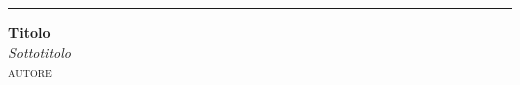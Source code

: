 \begin{titlepage}
	
    \raggedleft	

    \rule{1pt}{.9\textheight}
	\hspace{0.075\textwidth}
	\parbox[b]{.85\textwidth}{
		{\HUGE\bfseries Titolo
        }\\[2\baselineskip]
		{\Large\textit{Sottotitolo}}\\[47.5\baselineskip]
        {\Large\textsc{autore}}\\[1\baselineskip]
        
	}
\end{titlepage}